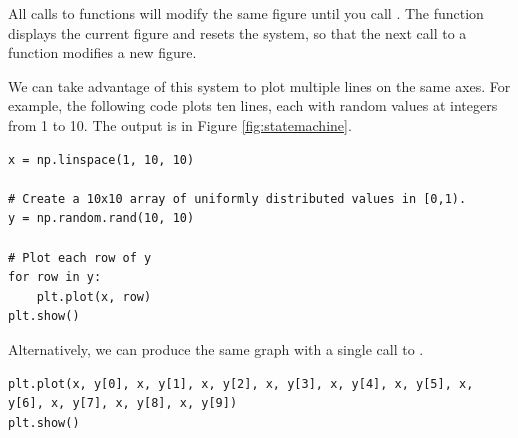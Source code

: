 All calls to  functions will modify the same figure until you call .
The function  displays the current figure and resets the system, so that the next call to a  function modifies a new figure.

We can take advantage of this system to plot multiple lines on the same axes.
For example, the following code plots ten lines, each with random values at integers from 1 to 10.
The output is in Figure \ref{fig:statemachine}.
\begin{lstlisting}
x = np.linspace(1, 10, 10)

# Create a 10x10 array of uniformly distributed values in [0,1).
y = np.random.rand(10, 10)

# Plot each row of y
for row in y:
    plt.plot(x, row)
plt.show()
\end{lstlisting}

Alternatively, we can produce the same graph with a single call to .
\begin{lstlisting}
plt.plot(x, y[0], x, y[1], x, y[2], x, y[3], x, y[4], x, y[5], x, y[6], x, y[7], x, y[8], x, y[9])
plt.show()
\end{lstlisting}

